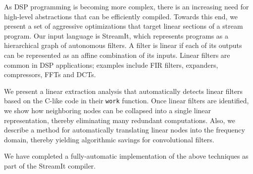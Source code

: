As DSP programming is becoming more complex, there is an increasing
need for high-level abstractions that can be efficiently compiled.
Towards this end, we present a set of aggressive optimizations that
target linear sections of a stream program.  Our input language is
StreamIt, which represents programs as a hierarchical graph of
autonomous filters.  A filter is linear if each of its outputs can be
represented as an affine combination of its inputs.  Linear filters
are common in DSP applications; examples include FIR filters,
expanders, compressors, FFTs and DCTs.

We present a linear extraction analysis that automatically detects
linear filters based on the C-like code in their {\tt work} function.
Once linear filters are identified, we show how neighboring nodes can
be collapsed into a single linear representation, thereby eliminating
many redundant computations.  Also, we describe a method for
automatically translating linear nodes into the frequency domain,
thereby yielding algorithmic savings for convolutional filters.

We have completed a fully-automatic implementation of the above
techniques as part of the StreamIt compiler.  

